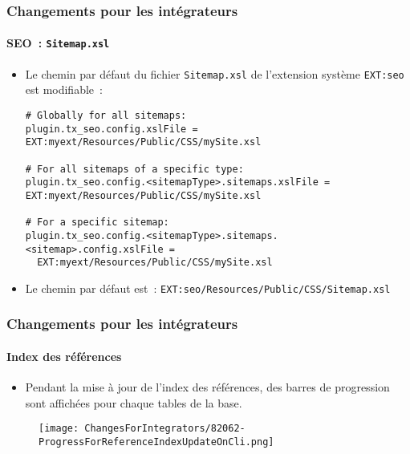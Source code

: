 
\begin{frame}[fragile]
	\frametitle{Changements pour les intégrateurs}
	\framesubtitle{SEO~: \texttt{Sitemap.xsl}}

	\lstset{basicstyle=\tiny\ttfamily}

	\begin{itemize}
		\item Le chemin par défaut du fichier \texttt{Sitemap.xsl} de l'extension
			système \texttt{EXT:seo} est modifiable~:

\vspace{-0.4cm}
\begin{lstlisting}
# Globally for all sitemaps:
plugin.tx_seo.config.xslFile = EXT:myext/Resources/Public/CSS/mySite.xsl

# For all sitemaps of a specific type:
plugin.tx_seo.config.<sitemapType>.sitemaps.xslFile = EXT:myext/Resources/Public/CSS/mySite.xsl

# For a specific sitemap:
plugin.tx_seo.config.<sitemapType>.sitemaps.<sitemap>.config.xslFile =
  EXT:myext/Resources/Public/CSS/mySite.xsl
\end{lstlisting}

		\item Le chemin par défaut est~:\newline
			\smaller
				\texttt{EXT:seo/Resources/Public/CSS/Sitemap.xsl}
			\normalsize

	\end{itemize}

\end{frame}


\begin{frame}[fragile]
	\frametitle{Changements pour les intégrateurs}
	\framesubtitle{Index des références}

	\lstset{basicstyle=\tiny\ttfamily}

	\begin{itemize}
		\item Pendant la mise à jour de l'index des références, des barres de progression sont
			affichées pour chaque tables de la base.
	\end{itemize}

	\begin{figure}
		\texttt{[image: ChangesForIntegrators/82062-ProgressForReferenceIndexUpdateOnCli.png]}
	\end{figure}

\end{frame}

